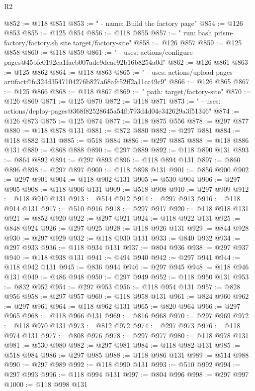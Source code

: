 \begin{lexlean}{R2}
\begin{coremodule}
@852 := @118 @851
@853 := "      - name: Build the factory page"
@854 := @126 @853
@855 := @125 @854
@856 := @118 @855
@857 := "        run: bash prism-factory/factory.sh site target/factory-site"
@858 := @126 @857
@859 := @125 @858
@860 := @118 @859
@861 := "      - uses: actions/configure-pages@45bfe0192ca1faeb007ade9deae92b16b8254a0d"
@862 := @126 @861
@863 := @125 @862
@864 := @118 @863
@865 := "      - uses: actions/upload-pages-artifact@fc324d3547104276b827a68afc52ff2a11cc49c9"
@866 := @126 @865
@867 := @125 @866
@868 := @118 @867
@869 := "          path: target/factory-site"
@870 := @126 @869
@871 := @125 @870
@872 := @118 @871
@873 := "      - uses: actions/deploy-pages@368f82528645a54fb793d4d04e342629a3f51346"
@874 := @126 @873
@875 := @125 @874
@877 := @118 @875 @556
@878 := @297 @877
@880 := @118 @878 @131
@881 := @872 @880
@882 := @297 @881
@884 := @118 @882 @131
@885 := @518 @884
@886 := @297 @885
@888 := @118 @886 @131
@889 := @868 @888
@890 := @297 @889
@892 := @118 @890 @131
@893 := @864 @892
@894 := @297 @893
@896 := @118 @894 @131
@897 := @860 @896
@898 := @297 @897
@900 := @118 @898 @131
@901 := @856 @900
@902 := @297 @901
@904 := @118 @902 @131
@905 := @530 @904
@906 := @297 @905
@908 := @118 @906 @131
@909 := @518 @908
@910 := @297 @909
@912 := @118 @910 @131
@913 := @514 @912
@914 := @297 @913
@916 := @118 @914 @131
@917 := @510 @916
@918 := @297 @917
@920 := @118 @918 @131
@921 := @852 @920
@922 := @297 @921
@924 := @118 @922 @131
@925 := @848 @924
@926 := @297 @925
@928 := @118 @926 @131
@929 := @844 @928
@930 := @297 @929
@932 := @118 @930 @131
@933 := @840 @932
@934 := @297 @933
@936 := @118 @934 @131
@937 := @804 @936
@938 := @297 @937
@940 := @118 @938 @131
@941 := @494 @940
@942 := @297 @941
@944 := @118 @942 @131
@945 := @836 @944
@946 := @297 @945
@948 := @118 @946 @131
@949 := @486 @948
@950 := @297 @949
@952 := @118 @950 @131
@953 := @832 @952
@954 := @297 @953
@956 := @118 @954 @131
@957 := @828 @956
@958 := @297 @957
@960 := @118 @958 @131
@961 := @824 @960
@962 := @297 @961
@964 := @118 @962 @131
@965 := @820 @964
@966 := @297 @965
@968 := @118 @966 @131
@969 := @816 @968
@970 := @297 @969
@972 := @118 @970 @131
@973 := @812 @972
@974 := @297 @973
@976 := @118 @974 @131
@977 := @808 @976
@978 := @297 @977
@980 := @118 @978 @131
@981 := @530 @980
@982 := @297 @981
@984 := @118 @982 @131
@985 := @518 @984
@986 := @297 @985
@988 := @118 @986 @131
@989 := @514 @988
@990 := @297 @989
@992 := @118 @990 @131
@993 := @510 @992
@994 := @297 @993
@996 := @118 @994 @131
@997 := @804 @996
@998 := @297 @997
@1000 := @118 @998 @131

\end{coremodule}
\end{lexlean}
